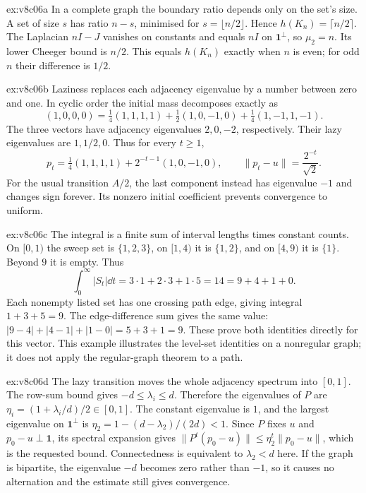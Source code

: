\begin{solution}{ex:v8c06a}
\idea In a complete graph the boundary ratio depends only on the set's size.
\writeup A set of size $s$ has ratio $n-s$, minimised for $s=\lfloor n/2\rfloor$. Hence $h(K_n)=\lceil n/2\rceil$. The Laplacian $nI-J$ vanishes on constants and equals $nI$ on $\mathbf1^\perp$, so $\mu_2=n$. Its lower Cheeger bound is $n/2$. This equals $h(K_n)$ exactly when $n$ is even; for odd $n$ their difference is $1/2$.
\end{solution}
\begin{solution}{ex:v8c06b}
\idea Laziness replaces each adjacency eigenvalue by a number between zero and one.
\writeup In cyclic order the initial mass decomposes exactly as
\[
(1,0,0,0)=\tfrac14(1,1,1,1)+\tfrac12(1,0,-1,0)
+\tfrac14(1,-1,1,-1).
\]
The three vectors have adjacency eigenvalues $2,0,-2$, respectively. Their lazy eigenvalues are $1,1/2,0$. Thus for every $t\ge1$,
\[
p_t=\tfrac14(1,1,1,1)+2^{-t-1}(1,0,-1,0),\qquad
\|p_t-u\|=\frac{2^{-t}}{\sqrt2}.
\]
For the usual transition $A/2$, the last component instead has eigenvalue $-1$ and changes sign forever. Its nonzero initial coefficient prevents convergence to uniform.
\end{solution}
\begin{solution}{ex:v8c06c}
\idea The integral is a finite sum of interval lengths times constant counts.
\writeup On $[0,1)$ the sweep set is $\{1,2,3\}$, on $[1,4)$ it is $\{1,2\}$, and on $[4,9)$ it is $\{1\}$. Beyond $9$ it is empty. Thus
\[
\int_0^\infty|S_t|\dd t=3\cdot1+2\cdot3+1\cdot5=14
=9+4+1+0.
\]
Each nonempty listed set has one crossing path edge, giving integral $1+3+5=9$. The edge-difference sum gives the same value: $|9-4|+|4-1|+|1-0|=5+3+1=9$. These prove both identities directly for this vector. This example illustrates the level-set identities on a nonregular graph; it does not apply the regular-graph theorem to a path.
\end{solution}
\begin{solution}{ex:v8c06d}
\idea The lazy transition moves the whole adjacency spectrum into $[0,1]$.
\writeup The row-sum bound gives $-d\le\lambda_i\le d$. Therefore the eigenvalues of $P$ are $\eta_i=(1+\lambda_i/d)/2\in[0,1]$. The constant eigenvalue is $1$, and the largest eigenvalue on $\mathbf1^\perp$ is $\eta_2=1-(d-\lambda_2)/(2d)<1$. Since $P$ fixes $u$ and $p_0-u\perp\mathbf1$, its spectral expansion gives
$\|P^t(p_0-u)\|\le\eta_2^t\|p_0-u\|$,
which is the requested bound. Connectedness is equivalent to $\lambda_2<d$ here. If the graph is bipartite, the eigenvalue $-d$ becomes zero rather than $-1$, so it causes no alternation and the estimate still gives convergence.
\end{solution}

